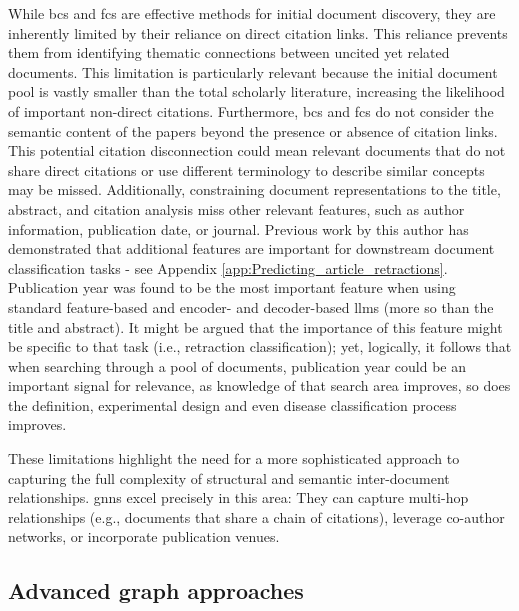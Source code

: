 \documentclass[10pt,oneside]{book}
\begin{document}
While \gls*{bcs} and \gls*{fcs} are effective methods for initial document discovery, they are inherently limited by their reliance on direct citation links. This reliance prevents them from identifying thematic connections between uncited yet related documents. This limitation is particularly relevant because the initial document pool is vastly smaller than the total scholarly literature, increasing the likelihood of important non-direct citations. Furthermore, \gls*{bcs} and \gls*{fcs} do not consider the semantic content of the papers beyond the presence or absence of citation links. This potential citation disconnection could mean relevant documents that do not share direct citations or use different terminology to describe similar concepts may be missed. Additionally, constraining document representations to the title, abstract, and citation analysis miss other relevant features, such as author information, publication date, or journal. Previous work by this author has demonstrated that additional features are important for downstream document classification tasks - see Appendix \ref{app:Predicting_article_retractions}. Publication year was found to be the most important feature when using standard feature-based and encoder- and decoder-based \gls*{llm}s (more so than the title and abstract). It might be argued that the importance of this feature might be specific to that task (i.e., retraction classification); yet, logically, it follows that when searching through a pool of documents, publication year could be an important signal for relevance, as knowledge of that search area improves, so does the definition, experimental design and even disease classification process improves.

These limitations highlight the need for a more sophisticated approach to capturing the full complexity of structural and semantic inter-document relationships. \gls*{gnn}s excel precisely in this area: They can capture multi-hop relationships (e.g., documents that share a chain of citations), leverage co-author networks, or incorporate publication venues.

\subsection{Advanced graph approaches}
\end{document}
